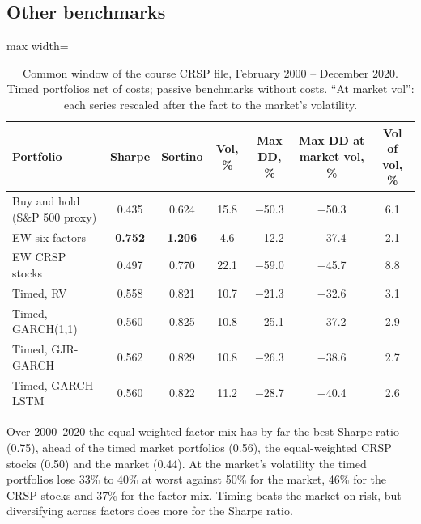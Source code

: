 \FloatBarrier
\subsection{Other benchmarks}\label{sec:otherbench}

\begin{table}[htbp]
\centering\small
\caption{Common window of the course CRSP file, February 2000 -- December 2020. Timed portfolios net of costs; passive benchmarks without costs. ``At market vol'': each series rescaled after the fact to the market's volatility.}\label{tab:bench}
\begin{adjustbox}{max width=\linewidth}\begin{tabular}{@{}lcccccc@{}}
\toprule
Portfolio & Sharpe & Sortino & Vol, \% & Max DD, \% & Max DD at market vol, \% & Vol of vol, \%\\
\midrule
Buy and hold (S\&P 500 proxy) & 0.435 & 0.624 & 15.8 & $-$50.3 & $-$50.3 & 6.1\\
EW six factors & \textbf{0.752} & \textbf{1.206} & 4.6 & $-$12.2 & $-$37.4 & 2.1\\
EW CRSP stocks & 0.497 & 0.770 & 22.1 & $-$59.0 & $-$45.7 & 8.8\\
Timed, RV & 0.558 & 0.821 & 10.7 & $-$21.3 & $-$32.6 & 3.1\\
Timed, GARCH(1,1) & 0.560 & 0.825 & 10.8 & $-$25.1 & $-$37.2 & 2.9\\
Timed, GJR-GARCH & 0.562 & 0.829 & 10.8 & $-$26.3 & $-$38.6 & 2.7\\
Timed, GARCH-LSTM & 0.560 & 0.822 & 11.2 & $-$28.7 & $-$40.4 & 2.6\\
\bottomrule
\end{tabular}\end{adjustbox}
\end{table}

Over 2000--2020 the equal-weighted factor mix has by far the best Sharpe ratio (0.75), ahead of the timed market portfolios (0.56), the equal-weighted CRSP stocks (0.50) and the market (0.44). At the market's volatility the timed portfolios lose 33\% to 40\% at worst against 50\% for the market, 46\% for the CRSP stocks and 37\% for the factor mix. Timing beats the market on risk, but diversifying across factors does more for the Sharpe ratio.

